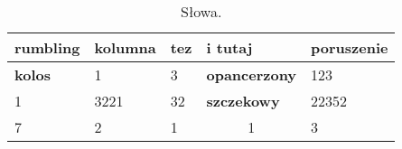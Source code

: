 \begin{table}[htbp]
\centering
\begin{tabular}{|l|l|l|l|l|}
\hline
rumbling       & kolumna & tez & i tutaj                & poruszenie \\ \hline
\textbf{kolos} & 1       & 3   & \textbf{opancerzony}   & 123        \\ \hline
1              & 3221    & 32  & \textbf{szczekowy}     & 22352      \\ \hline
7              & 2       & 1   & \multicolumn{1}{c|}{1} & 3          \\ \hline
\end{tabular}
\label{tab:words}
    \caption{Słowa.}
\end{table}